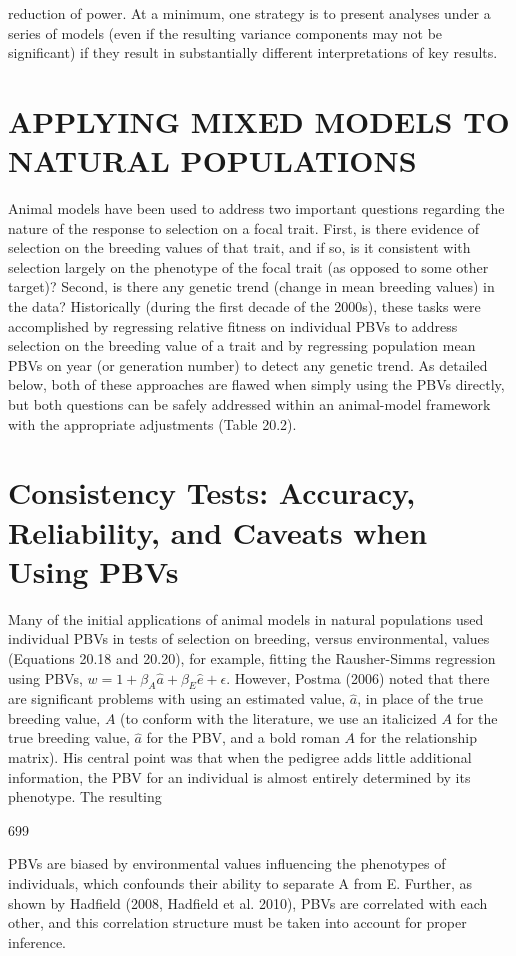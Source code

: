 \documentclass{article}
\begin{document}
reduction of power. At a minimum, one strategy is to present analyses under a series of models (even if the resulting variance components may not be significant) if they result in substantially different interpretations of key results.

\section{APPLYING MIXED MODELS TO NATURAL POPULATIONS}
Animal models have been used to address two important questions regarding the nature of the response to selection on a focal trait. First, is there evidence of selection on the breeding values of that trait, and if so, is it consistent with selection largely on the phenotype of the focal trait (as opposed to some other target)? Second, is there any genetic trend (change in mean breeding values) in the data? Historically (during the first decade of the 2000s), these tasks were accomplished by regressing relative fitness on individual PBVs to address selection on the breeding value of a trait and by regressing population mean PBVs on year (or generation number) to detect any genetic trend. As detailed below, both of these approaches are flawed when simply using the PBVs directly, but both questions can be safely addressed within an animal-model framework with the appropriate adjustments (Table 20.2).

\section{Consistency Tests: Accuracy, Reliability, and Caveats when Using PBVs}
Many of the initial applications of animal models in natural populations used individual PBVs in tests of selection on breeding, versus environmental, values (Equations 20.18 and 20.20), for example, fitting the Rausher-Simms regression using PBVs,  $ w = 1 + \beta_A \widehat{a} + \beta_E \widehat{e} + \epsilon $. However, Postma (2006) noted that there are significant problems with using an estimated value,  $ \widehat{a} $, in place of the true breeding value,  $ A $ (to conform with the literature, we use an italicized  $ A $ for the true breeding value,  $ \widehat{a} $ for the PBV, and a bold roman  $ A $ for the relationship matrix). His central point was that when the pedigree adds little additional information, the PBV for an individual is almost entirely determined by its phenotype. The resulting

699

PBVs are biased by environmental values influencing the phenotypes of individuals, which confounds their ability to separate A from E. Further, as shown by Hadfield (2008, Hadfield et al. 2010), PBVs are correlated with each other, and this correlation structure must be taken into account for proper inference.
\end{document}
